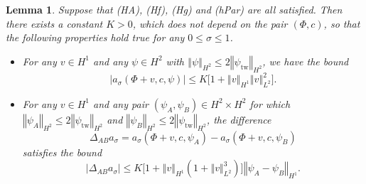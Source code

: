 \documentclass[10pt]{articleHJ}
\newcommand{\abs}[1]{\left\vert#1\right\vert}			%
\newcommand{\norm}[1]{\left\Vert#1\right\Vert}		%
\newtheorem{lem}[thm]{Lemma}
\numberwithin{equation}{section}
\begin{document}
\begin{lem}
\label{lem:var:bnds:a}
Suppose that (HA), (Hf),
(Hg) and (hPar) are all satisfied.
Then there exists a constant $K > 0$, which does not
depend on the pair $(\Phi, c)$, so that the following
properties hold true for any $0 \le \sigma \le 1$.
\begin{itemize}
\item[(i)]{
For any $v \in H^1$
and any $\psi \in H^2$ with
$\norm{\psi}_{H^2} \le 2 \norm{\psi_{\mathrm{tw}}}_{H^2}$,
we have the bound
\begin{equation}
\abs{a_{\sigma}(\Phi + v , c,\psi) }
\le K \Big[1
   + \norm{v}_{H^1} \norm{v}_{L^2}^2
     \Big]  .
\end{equation}
}
\item[(ii)]{For any $v \in H^1$
and any pair  $(\psi_A, \psi_B) \in H^2 \times H^2$
for which $\norm{\psi_A}_{H^2} \le 2 \norm{\psi_{\mathrm{tw}}}_{H^2}$
and $\norm{\psi_B}_{H^2} \le 2 \norm{\psi_{\mathrm{tw}}}_{H^2}$,
the difference
\begin{equation}
  \Delta_{AB} a_{\sigma} =
  a_{\sigma}(\Phi + v , c,\psi_A )
  - a_{\sigma}(\Phi + v , c,\psi_B)
\end{equation}
satisfies the bound
\begin{equation}
\abs{ \Delta_{AB} a_{\sigma} }
 \le
K \Big[ 1  + \norm{v}_{H^1} (1 + \norm{v}_{L^2}^3) \Big]
  \norm{\psi_A -\psi_B}_{H^1} .
\end{equation}
}
\end{itemize}
\end{lem}
\end{document}
